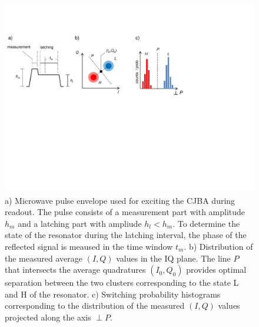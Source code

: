 \begin{figure}[ht!]
\centering
\includegraphics[width=\textwidth]{./material/figures/measurement/readout}
\caption{a) Microwave pulse envelope used for exciting the CJBA during readout. The pulse consists of a measurement part with amplitude $h_m$ and a latching part with ampliude $h_l<h_m$. To determine the state of the resonator during the latching interval, the phase of the reflected signal is meaused in the time window $t_m$. b) Distribution of the measured average $(I,Q)$ values in the IQ plane. The line $P$ that intersects the average quadratures $(I_0,Q_0)$ provides optimal separation between the two clusters corresponding to the state L and H of the resonator. c) Switching probability histograms corresponding to the distribution of the measured $(I,Q)$ values projected along the axis $\perp P$.}
\label{fig:readout_bringup}
\end{figure}

